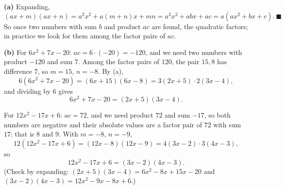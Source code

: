 \textbf{(a)} Expanding,
\[(ax+m)(ax+n)=a^2x^2+a(m+n)x+mn=a^2x^2+abx+ac=a\left(ax^2+bx+c\right).\ \blacksquare\]
So once two numbers with sum $b$ and product $ac$ are found, the quadratic factors; in practice we look for them among the factor pairs of $ac$.

\textbf{(b)} For $6x^2+7x-20$: $ac=6\cdot(-20)=-120$, and we need two numbers with product $-120$ and sum $7$. Among the factor pairs of $120$, the pair $15,8$ has difference $7$, so $m=15$, $n=-8$. By (a),
\[6\left(6x^2+7x-20\right)=(6x+15)(6x-8)=3(2x+5)\cdot2(3x-4),\]
and dividing by $6$ gives
\[6x^2+7x-20=\boxed{(2x+5)(3x-4)}.\]

For $12x^2-17x+6$: $ac=72$, and we need product $72$ and sum $-17$, so both numbers are negative and their absolute values are a factor pair of $72$ with sum $17$: that is $8$ and $9$. With $m=-8$, $n=-9$,
\[12\left(12x^2-17x+6\right)=(12x-8)(12x-9)=4(3x-2)\cdot3(4x-3),\]
so
\[12x^2-17x+6=\boxed{(3x-2)(4x-3)}.\]
(Check by expanding: $(2x+5)(3x-4)=6x^2-8x+15x-20$ and $(3x-2)(4x-3)=12x^2-9x-8x+6$.)
